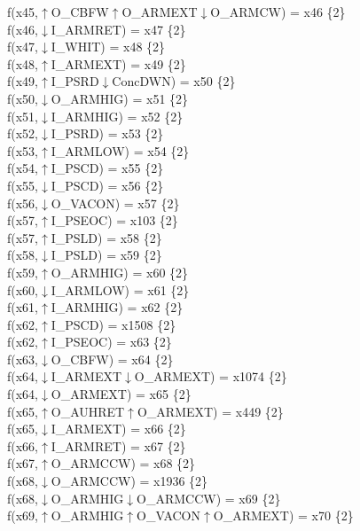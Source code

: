 f(x45,$\uparrow$O\_CBFW$\uparrow$O\_ARMEXT$\downarrow$O\_ARMCW) = x46 \{2\} \\  
f(x46,$\downarrow$I\_ARMRET) = x47 \{2\} \\  
f(x47,$\downarrow$I\_WHIT) = x48 \{2\} \\  
f(x48,$\uparrow$I\_ARMEXT) = x49 \{2\} \\  
f(x49,$\uparrow$I\_PSRD$\downarrow$ConcDWN) = x50 \{2\} \\  
f(x50,$\downarrow$O\_ARMHIG) = x51 \{2\} \\  
f(x51,$\downarrow$I\_ARMHIG) = x52 \{2\} \\  
f(x52,$\downarrow$I\_PSRD) = x53 \{2\} \\  
f(x53,$\uparrow$I\_ARMLOW) = x54 \{2\} \\  
f(x54,$\uparrow$I\_PSCD) = x55 \{2\} \\  
f(x55,$\downarrow$I\_PSCD) = x56 \{2\} \\  
f(x56,$\downarrow$O\_VACON) = x57 \{2\} \\  
f(x57,$\uparrow$I\_PSEOC) = x103 \{2\} \\  
f(x57,$\uparrow$I\_PSLD) = x58 \{2\} \\  
f(x58,$\downarrow$I\_PSLD) = x59 \{2\} \\  
f(x59,$\uparrow$O\_ARMHIG) = x60 \{2\} \\  
f(x60,$\downarrow$I\_ARMLOW) = x61 \{2\} \\  
f(x61,$\uparrow$I\_ARMHIG) = x62 \{2\} \\  
f(x62,$\uparrow$I\_PSCD) = x1508 \{2\} \\  
f(x62,$\uparrow$I\_PSEOC) = x63 \{2\} \\  
f(x63,$\downarrow$O\_CBFW) = x64 \{2\} \\  
f(x64,$\downarrow$I\_ARMEXT$\downarrow$O\_ARMEXT) = x1074 \{2\} \\  
f(x64,$\downarrow$O\_ARMEXT) = x65 \{2\} \\  
f(x65,$\uparrow$O\_AUHRET$\uparrow$O\_ARMEXT) = x449 \{2\} \\  
f(x65,$\downarrow$I\_ARMEXT) = x66 \{2\} \\  
f(x66,$\uparrow$I\_ARMRET) = x67 \{2\} \\  
f(x67,$\uparrow$O\_ARMCCW) = x68 \{2\} \\  
f(x68,$\downarrow$O\_ARMCCW) = x1936 \{2\} \\  
f(x68,$\downarrow$O\_ARMHIG$\downarrow$O\_ARMCCW) = x69 \{2\} \\  
f(x69,$\uparrow$O\_ARMHIG$\uparrow$O\_VACON$\uparrow$O\_ARMEXT) = x70 \{2\} \\  
